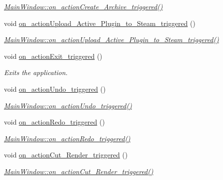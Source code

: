 \begin{DoxyCompactItemize}
\begin{DoxyCompactList}\small\item\em \hyperlink{class_main_window_a6ac0bcf0b051abe049c84075e0a5d13a}{Main\+Window\+::on\+\_\+action\+Create\+\_\+\+Archive\+\_\+triggered()} \end{DoxyCompactList}\item 
void \hyperlink{class_main_window_a3e35b065b22cbe720c98787325b348c9}{on\+\_\+action\+Upload\+\_\+\+Active\+\_\+\+Plugin\+\_\+to\+\_\+\+Steam\+\_\+triggered} ()
\begin{DoxyCompactList}\small\item\em \hyperlink{class_main_window_a3e35b065b22cbe720c98787325b348c9}{Main\+Window\+::on\+\_\+action\+Upload\+\_\+\+Active\+\_\+\+Plugin\+\_\+to\+\_\+\+Steam\+\_\+triggered()} \end{DoxyCompactList}\item 
void \hyperlink{class_main_window_ab4487c4b02224acd4a0193d38b704ddb}{on\+\_\+action\+Exit\+\_\+triggered} ()
\begin{DoxyCompactList}\small\item\em Exits the application. \end{DoxyCompactList}\item 
void \hyperlink{class_main_window_abbab7cd8683132f28cf976d069c7c448}{on\+\_\+action\+Undo\+\_\+triggered} ()
\begin{DoxyCompactList}\small\item\em \hyperlink{class_main_window_abbab7cd8683132f28cf976d069c7c448}{Main\+Window\+::on\+\_\+action\+Undo\+\_\+triggered()} \end{DoxyCompactList}\item 
void \hyperlink{class_main_window_a386390413f5b36190ba30ab8d4c653d0}{on\+\_\+action\+Redo\+\_\+triggered} ()
\begin{DoxyCompactList}\small\item\em \hyperlink{class_main_window_a386390413f5b36190ba30ab8d4c653d0}{Main\+Window\+::on\+\_\+action\+Redo\+\_\+triggered()} \end{DoxyCompactList}\item 
void \hyperlink{class_main_window_aab15905e4c662653ff9e22457ab18964}{on\+\_\+action\+Cut\+\_\+\+Render\+\_\+triggered} ()
\begin{DoxyCompactList}\small\item\em \hyperlink{class_main_window_aab15905e4c662653ff9e22457ab18964}{Main\+Window\+::on\+\_\+action\+Cut\+\_\+\+Render\+\_\+triggered()} \end{DoxyCompactList}\item 

\end{DoxyCompactItemize}
